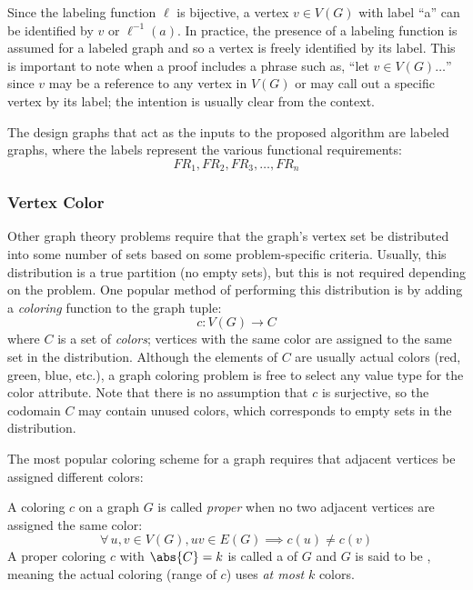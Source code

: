 Since the labeling function \(\ell\) is bijective, a vertex \(v\in V(G)\) with label ``a'' can be identified by
\(v\) or \(\ell^{-1}(a)\).  In practice, the presence of a labeling function is assumed for a labeled graph and so
a vertex is freely identified by its label.  This is important to note when a proof includes a phrase such as,
``let \(v\in V(G)\ldots\)'' since \(v\) may be a reference to any vertex in \(V(G)\) or may call out a specific
vertex by its label; the intention is usually clear from the context.

The design graphs that act as the inputs to the proposed algorithm are labeled graphs, where the labels represent
the various functional requirements:
\[FR_1,FR_2,FR_3,\ldots,FR_n\]

\subsubsection{Vertex Color}

Other graph theory problems require that the graph's vertex set be distributed into some number of sets based on
some problem-specific criteria.  Usually, this distribution is a true partition (no empty sets), but this is not
required depending on the problem.  One popular method of performing this distribution is by adding a
\emph{coloring} function to the graph tuple:
\[c:V(G)\to C\]
where \(C\) is a set of \emph{colors}; vertices with the same color are assigned to the same set in the
distribution.  Although the elements of \(C\) are usually actual colors (red, green, blue, etc.), a graph coloring
problem is free to select any value type for the color attribute.  Note that there is no assumption that \(c\) is
surjective, so the codomain \(C\) may contain unused colors, which corresponds to empty sets in the distribution.

The most popular coloring scheme for a graph requires that adjacent vertices be assigned different colors:

\begin{definition}
  A coloring \(c\) on a graph \(G\) is called \emph{proper} when no two adjacent vertices are assigned the same color:
  \[\forall\,u,v\in V(G),uv\in E(G)\implies c(u)\ne c(v)\]
  A proper coloring \(c\) with \(\abs{C}=k\) is called a \emph{} of \(G\) and \(G\) is said to be
  \emph{}, meaning the actual coloring (range of \(c\)) uses \emph{at most} \(k\) colors.
\end{definition}


